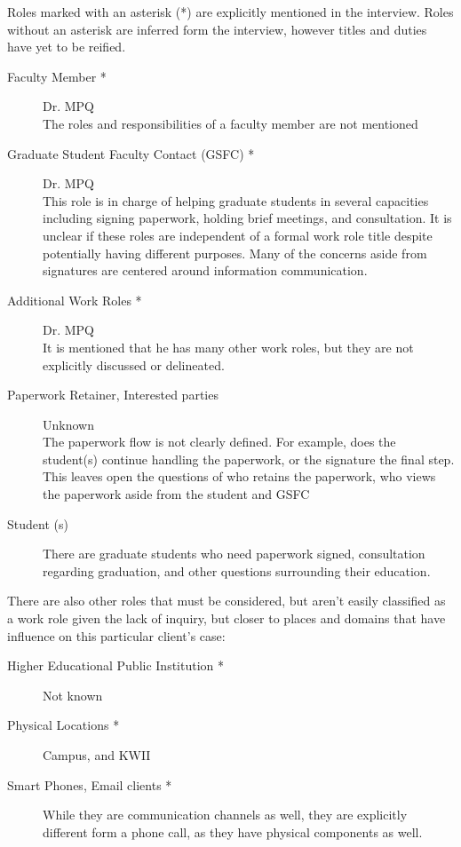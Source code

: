 \documentclass[11pt]{article}
\begin{document}
  Roles marked with an asterisk (\**) are explicitly mentioned in the interview.
  Roles without an asterisk are inferred form the interview, however titles and duties have yet to be reified.
  \begin{description} %
  \item[Faculty Member \**]
  Dr. MPQ\\
  The roles and responsibilities of a faculty member are not mentioned
  \item[Graduate Student Faculty Contact (GSFC) \**]
  Dr. MPQ\\
  This role is in charge of helping graduate students in several capacities including signing paperwork, holding brief meetings, and consultation.
  It is unclear if these roles are independent of a formal work role title despite potentially having different purposes.
  Many of the concerns aside from signatures are centered around information communication.

  \item[Additional Work Roles \**]
  Dr. MPQ\\
  It is mentioned that he has many other work roles, but they are not explicitly discussed or delineated.

  \item[Paperwork Retainer, Interested parties]
  Unknown\\
  The paperwork flow is not clearly defined.
  For example, does the student(s) continue handling the paperwork, or the signature the final step.
  This leaves open the questions of who retains the paperwork, who views the paperwork aside from the student and GSFC

  \item[Student (s)]
  There are graduate students who need paperwork signed, consultation regarding graduation, and other questions surrounding their education.
  
  \end{description}

  There are also other roles that must be considered, but aren't easily classified as a work role given the lack of inquiry, but closer to places and domains that have influence on this particular client's case:
  \begin{description} %
    \item[Higher Educational Public Institution \**]
    Not known\\
    \item[Physical Locations \**]
    Campus, and KWII\\
    \item[Smart Phones, Email clients \**]
    While they are communication channels as well, they are explicitly different form a phone call, as they have physical components as well.
  \end{description}
\end{document}
